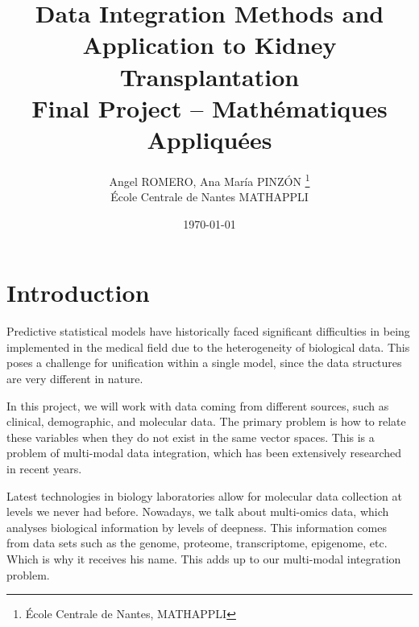 \documentclass[11pt,a4paper]{article}
\title{\Large \textbf{Data Integration Methods and Application to Kidney Transplantation}\\
\vspace{0.3em}\normalsize Final Project -- Mathématiques Appliquées}
\author{
Angel ROMERO, Ana María PINZÓN
\thanks{École Centrale de Nantes, MATHAPPLI} \\
\small {École Centrale de Nantes}
\small {MATHAPPLI}
}
\date{\today}
\begin{document}


\section{Introduction}


Predictive statistical models have historically faced significant difficulties in being implemented in the medical field due to the heterogeneity of biological data. This poses a challenge for unification within a single model, since the data structures are very different in nature.

In this project, we will work with data coming from different sources, such as clinical, demographic, and molecular data. The primary problem is how to relate these variables when they do not exist in the same vector spaces. This is a problem of multi-modal data integration, which has been extensively researched in recent years.

Latest technologies in biology laboratories allow for molecular data collection at levels we never had before. Nowadays, we talk about multi-omics data, which analyses biological information by levels of deepness. This information comes from data sets such as the genome, proteome, transcriptome, epigenome, etc. Which is why it receives his name. This adds up to our multi-modal integration problem.
\end{document}
